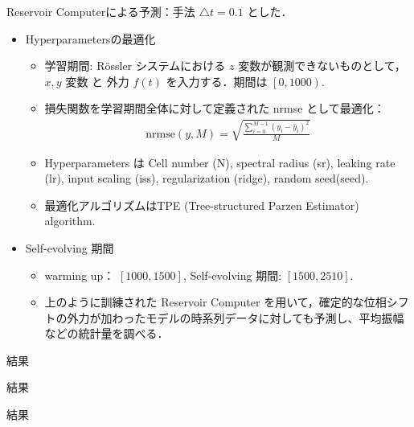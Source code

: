 \begin{frame}{Reservoir Computerによる予測：手法}
    $\triangle t = 0.1$ とした．
    \begin{itemize}
        \item Hyperparametersの最適化
        \begin{itemize}
            \item 学習期間: Rössler システムにおける $z$ 変数が観測できないものとして， $x, y$ 変数 と 外力 $f(t)$ を入力する．期間は $\left.\left[ 0, 1000 \right.\right).$ \vspace{.2em}
            \item 損失関数を学習期間全体に対して定義された nrmse として最適化：
            \vspace{.2em}
            \begin{align}
                \text{nrmse}(y, M) = \sqrt{\frac{\sum_{i=0}^{M-1}\left(y_i-\hat{y}_i\right)^2}{M}}
            \end{align}
            \item Hyperparameters は Cell number (N), spectral radius (sr), leaking rate (lr), input scaling (iss), regularization (ridge), random seed(seed). \vspace{.2em}
            \item 最適化アルゴリズムはTPE (Tree-structured Parzen Estimator) algorithm.
        \end{itemize}
        \item Self-evolving 期間
        \begin{itemize}
            \item warming up：
            $\left.\left[ 1000,  1500\right.\right]$, Self-evolving 期間: $\left[ 1500,  2510\right].$
            \item 上のように訓練された Reservoir Computer を用いて，確定的な位相シフトの外力が加わったモデルの時系列データに対しても予測し、平均振幅などの統計量を調べる．
        \end{itemize}
    \end{itemize}
\end{frame}

\begin{frame}{結果}

\end{frame}

\begin{frame}{結果}

\end{frame}

\begin{frame}{結果}

\end{frame}







